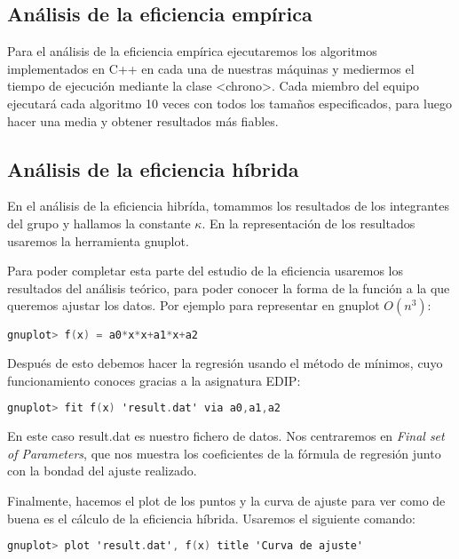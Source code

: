 \documentclass[a4paper,12pt]{article} %
\begin{document}
\subsection{Análisis de la eficiencia empírica}
Para el análisis de la eficiencia empírica ejecutaremos los algoritmos implementados en C++ en cada
una de nuestras máquinas y mediermos el tiempo de ejecución mediante la
clase <chrono>. Cada miembro del equipo ejecutará cada algoritmo 10 veces con todos los tamaños especificados,
para luego hacer una media y obtener resultados más fiables.
\subsection{Análisis de la eficiencia híbrida}
En el análisis de la eficiencia hibrída, tomammos los resultados de los integrantes del grupo y hallamos
la constante $\kappa$. En la representación de los resultados usaremos la herramienta gnuplot.

Para poder completar esta parte del estudio de la eficiencia usaremos los resultados del análisis teórico, para
poder conocer la forma de la función a la que queremos ajustar los datos. Por ejemplo para representar en gnuplot $O(n^{3})$:

\begin{lstlisting}[language=C, caption={Ejemplo de $O(n^{2})$}]
       gnuplot> f(x) = a0*x*x+a1*x+a2
        \end{lstlisting}

Después de esto debemos hacer la regresión usando el método de mínimos, cuyo funcionamiento conoces gracias a la asignatura EDIP:

\begin{lstlisting}[language=C, caption={Uso de gnuplot para la regresión}]
        gnuplot> fit f(x) 'result.dat' via a0,a1,a2
         \end{lstlisting}

En este caso result.dat es nuestro fichero de datos.
Nos centraremos en \textit{Final set of Parameters}, que nos muestra los coeficientes de la fórmula de regresión
junto con la bondad del ajuste realizado.

Finalmente, hacemos el plot de los puntos y la curva de ajuste para ver como de buena es el cálculo de la eficiencia híbrida. Usaremos el
siguiente comando:

\begin{lstlisting}[language=C, caption={Representación de la regresión}]
        gnuplot> plot 'result.dat', f(x) title 'Curva de ajuste'
         \end{lstlisting}
\end{document}
